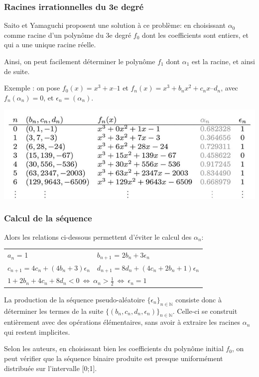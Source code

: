 \documentclass{scrartcl}
\begin{document}
\subsubsection{Racines irrationnelles du 3e degré}\label{ss:saito}
Saito et Yamaguchi \cite{SY} proposent une solution à ce problème: en
choisissant $\alpha_0$ comme racine d’un polynôme du 3e degré $f_0$ dont les
coefficients sont entiers, et qui a une unique racine réelle. \par
Ainsi, on peut facilement déterminer le polynôme $f_1$ dont $\alpha_1$ est la
racine, et ainsi de suite. \par
Exemple : on pose $f_0(x) = x^3+x–1$ et $f_n(x) = x^3+b_nx^2+c_nx–d_n$, avec
$f_n(\alpha_n) = 0$, et $\epsilon_n = (\alpha_n)$.
\begin{center}
  \includegraphics[scale=0.75]{img/SaitoYamaguchi2017.png}  
\end{center}

\subsubsection{Calcul de la séquence}
Alors les relations ci-dessous permettent d'éviter le calcul des $\alpha_n$:\par
\begin{tabular}{ l l }
  $a_n$ = 1 & $b_{n+1}$ = $2b_n+3\epsilon_n$ \\
  $c_{n+1} = 4c_n+(4b_n+3)\epsilon_n$ 
            & $d_{n+1} = 8d_n+(4c_n+2b_n+1)\epsilon_n$ \\
  \multicolumn{2}{l}{$1 + 2b_n + 4c_n + 8d_n < 0 \ \Leftrightarrow \ \alpha_n > \frac{1}{2} \ \Leftrightarrow \ \epsilon_n = 1 $}
\end{tabular}\par
La production de la séquence pseudo-aléatoire
$\{\epsilon_n\}_{n \in \mathbb{N}}$ consiste donc à déterminer les termes de la
suite $\{ (b_n,c_n,d_n,\epsilon_n) \}_{n \in \mathbb{N}}$. Celle-ci se construit
entièrement avec des opérations élémentaires, sans avoir à extraire les racines
$\alpha_n$ qui restent implicites. \par
\medskip Selon les auteurs, en choisissant bien les coefficients du polynôme
initial $f_0$, on peut vérifier que la séquence binaire produite est presque
uniformément distribuée sur l’intervalle [0;1]. \par
\end{document}

